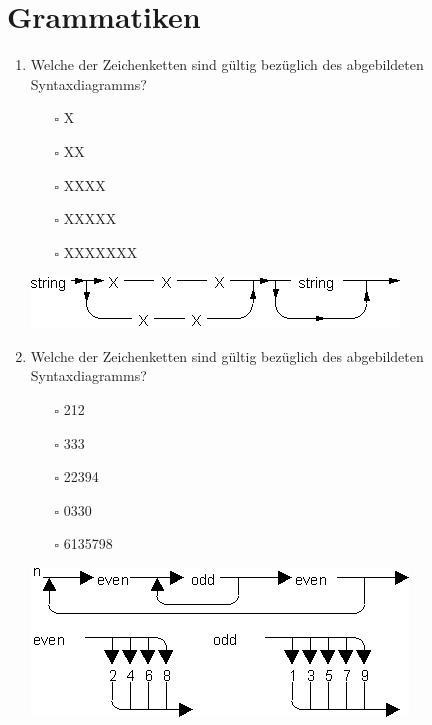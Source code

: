 \documentclass[]{article}
\begin{document}
	
	\section{Grammatiken}
	
	\begin{enumerate}
		\item Welche der Zeichenketten sind gültig bezüglich des abgebildeten Syntaxdiagramms?
		
		\begin{minipage}{0.4\linewidth}
		\begin{itemize}
			\item[$\square$] X
			\item[$\square$] XX
			\item[$\square$] XXXX
			\item[$\square$] XXXXX
			\item[$\square$] XXXXXXX
		\end{itemize}
		\end{minipage}
		\begin{minipage}{0.5\linewidth}
			\includegraphics[width=\linewidth]{figures/syntax-string.png}
		\end{minipage}
		\vspace{2ex}
		
		\item Welche der Zeichenketten sind gültig bezüglich des abgebildeten Syntaxdiagramms?
		
		\begin{minipage}{0.4\linewidth}
			\begin{itemize}
				\item[$\square$] 212
				\item[$\square$] 333
				\item[$\square$] 22394
				\item[$\square$] 0330
				\item[$\square$] 6135798
			\end{itemize}
		\end{minipage}
		\begin{minipage}{0.5\linewidth}
			\includegraphics[width=\linewidth]{figures/syntax-evenodd.png}
		\end{minipage}
		\vspace{2ex}
		

\end{enumerate}
\end{document}

